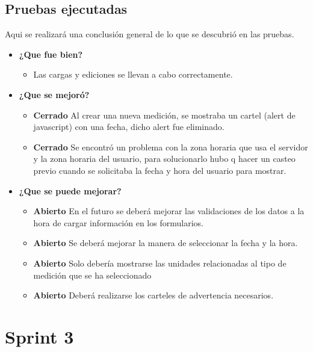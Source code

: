 \documentclass[a4paper,12pt]{article}
\begin{document}
\subsection{Pruebas ejecutadas}
Aqui se realizará una conclusión general de lo que se descubrió en las pruebas.
	\begin{itemize}
		\item \textbf{¿Que fue bien?}
        	\begin{itemize}
				\item        Las cargas y ediciones se llevan a cabo correctamente.
			\end{itemize}

   		\item \textbf{¿Que se mejoró?}
        	\begin{itemize}
				\item \textbf{Cerrado} Al crear una nueva medición, se mostraba un cartel (alert de javascript) con una fecha, dicho alert fue eliminado.
                \item \textbf{Cerrado} Se encontró un problema con la zona horaria que usa el servidor y la zona horaria del usuario, para solucionarlo hubo q hacer un casteo previo cuando se solicitaba la fecha y hora del usuario para mostrar.
			\end{itemize}

   		\item \textbf{¿Que se puede mejorar?}
        	\begin{itemize}
		        \item \textbf{Abierto} En el futuro se deberá mejorar las validaciones de los datos a la hora de cargar información en los formularios.
        		\item \textbf{Abierto} Se deberá mejorar la manera de seleccionar la fecha y la hora.
		        \item \textbf{Abierto} Solo debería mostrarse las unidades relacionadas al tipo de medición que se ha seleccionado  
                \item \textbf{Abierto} Deberá realizarse los carteles de advertencia necesarios.
            \end{itemize}
        

	\end{itemize}



\section{Sprint 3}%
\end{document}
